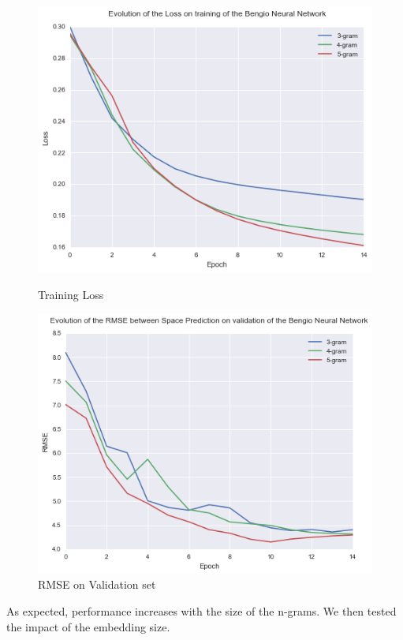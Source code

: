 \documentclass[11pt]{article}
\begin{document}
\begin{figure}[H]
\centering
\begin{minipage}{.5\textwidth}
  \centering
  \includegraphics[width=1\linewidth]{train_nn}
  \caption{Training Loss}
\end{minipage}%
\begin{minipage}{.5\textwidth}
  \centering
  \includegraphics[width=1\linewidth]{rmse}
  \caption{RMSE on Validation set}
\end{minipage}
\end{figure}

As expected, performance increases with the size of the n-grams. We then tested the impact of the embedding size. 
\end{document}
